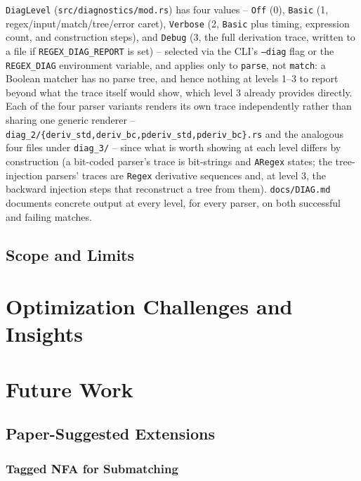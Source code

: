 \texttt{DiagLevel} (\texttt{src/diagnostics/mod.rs}) has four values --
\texttt{Off} (0), \texttt{Basic} (1, regex/input/match/tree/error caret),
\texttt{Verbose} (2, \texttt{Basic} plus timing, expression count, and
construction steps), and \texttt{Debug} (3, the full derivation trace,
written to a file if \texttt{REGEX\_DIAG\_REPORT} is set) -- selected via
the CLI's \texttt{--diag} flag or the \texttt{REGEX\_DIAG} environment
variable, and applies only to \texttt{parse}, not \texttt{match}: a
Boolean matcher has no parse tree, and hence nothing at levels 1--3 to
report beyond what the trace itself would show, which level 3 already
provides directly. Each of the four parser variants renders its own
trace independently rather than sharing one generic renderer --
\texttt{diag\_2/\{deriv\_std,deriv\_bc,pderiv\_std,pderiv\_bc\}.rs} and
the analogous four files under \texttt{diag\_3/} -- since what is worth
showing at each level differs by construction (a bit-coded parser's trace
is bit-strings and \texttt{ARegex} states; the tree-injection parsers'
traces are \texttt{Regex} derivative sequences and, at level 3, the
backward injection steps that reconstruct a tree from them).
\texttt{docs/DIAG.md} documents concrete output at every level, for every
parser, on both successful and failing matches.

\subsection{Scope and Limits}
\label{sec:diagnostics-scope-limits}

\section{Optimization Challenges and Insights}
\label{sec:optimization-challenges}


\section{Future Work}
\label{sec:future-work}

\subsection{Paper-Suggested Extensions}
\label{sec:paper-suggested-extensions}

\subsubsection{Tagged NFA for Submatching}
\label{sec:tagged-nfa}

